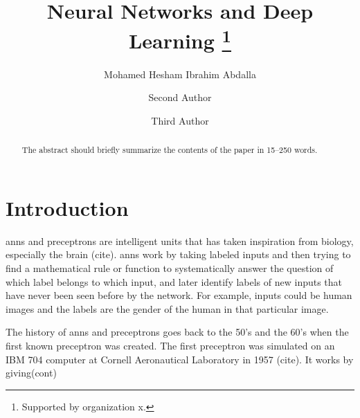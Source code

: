 \documentclass[runningheads]{llncs}
\begin{document}
%
\title{Neural Networks and Deep Learning \thanks{Supported by organization x.}}
%
%
\author{Mohamed Hesham Ibrahim Abdalla \and
Second Author \and
Third Author}
%
%
%
\maketitle              %
%
\begin{abstract}
The abstract should briefly summarize the contents of the paper in
15--250 words.

\end{abstract}
%
%
%
\section{Introduction}

\gls{anns} and preceptrons are intelligent units that has taken inspiration
from biology, especially the brain (cite). \gls{anns} work by taking labeled inputs
and then trying to find a mathematical rule or function to systematically answer the question
of which label belongs to which input, and later identify labels of new inputs that have never been seen before by the network. For example, inputs could be human images and the labels are 
the gender of the human in that particular image.

The history of \gls{anns} and preceptrons goes back to the 50's and the 60's when 
the first known preceptron was created. The first preceptron was simulated on an IBM 704 computer at Cornell Aeronautical Laboratory in 1957 (cite).  It works by giving(cont)
\end{document}
